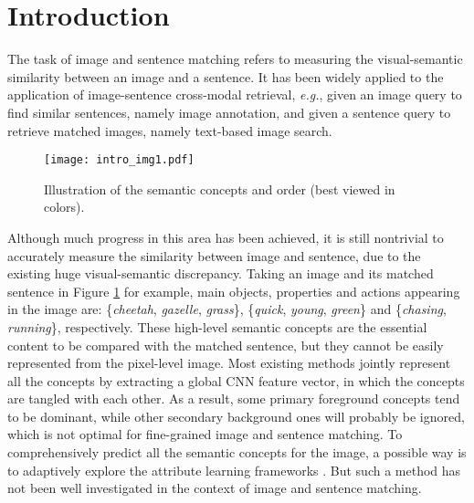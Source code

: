 \documentclass[10pt,twocolumn,letterpaper]{article}
\begin{document}
\section{Introduction}
The task of image and sentence matching refers to measuring the visual-semantic similarity
between an image and a sentence. It has been widely applied to the application
of image-sentence cross-modal retrieval, \emph{e.g.},
given an image query to find similar sentences, namely image annotation,
and given a sentence query to retrieve matched images, namely text-based image search.

\begin{figure}[t]
\centering
\texttt{[image: intro\_img1.pdf]}
\caption{Illustration of the semantic concepts and order (best viewed in colors).}
\label{figure:intro}
\end{figure}


Although much progress in this area has been achieved,
it is still nontrivial to accurately measure the similarity between image and sentence,
due to the existing huge visual-semantic discrepancy.
Taking an image and its matched sentence in Figure \ref{figure:intro} for example,
main objects, properties and actions appearing in the image are:
\{\emph{cheetah}, \emph{gazelle}, \emph{grass}\}, \{\emph{quick}, \emph{young}, \emph{green}\}
and \{\emph{chasing}, \emph{running}\}, respectively.
These high-level semantic concepts are the essential content
to be compared with the matched sentence,
but they cannot be easily represented from the pixel-level image.
Most existing methods \cite{huang2016instance,klein2015associating,ma2015multimodal}
jointly represent all the concepts by extracting a global CNN \cite{simonyan2014very} feature vector,
in which the concepts are tangled with each other.
As a result, some primary foreground concepts tend to be dominant,
while other secondary background ones will probably be ignored,
which is not optimal for fine-grained image and sentence matching.
To comprehensively predict all the semantic concepts for the image,
a possible way is to adaptively explore the attribute learning frameworks
\cite{fang2015captions,wu2016value,wei2014cnn}.
But such a method has not been well investigated
in the context of image and sentence matching.
\end{document}

